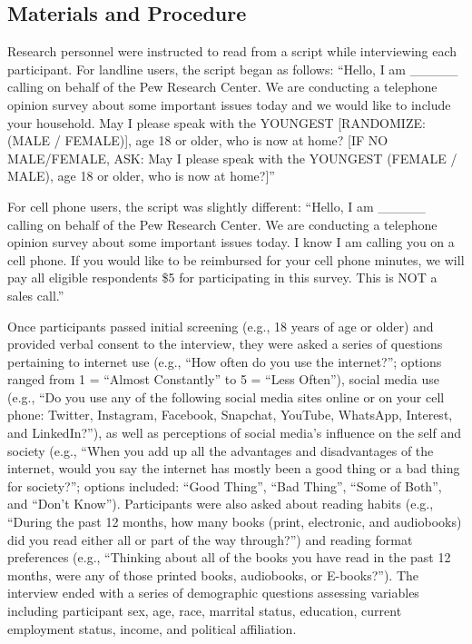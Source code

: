 \documentclass[man, fleqn, noextraspace]{apa6}
\theoremstyle{definition}
\theoremstyle{definition}
\theoremstyle{definition}
\theoremstyle{remark}
\begin{document}
\subsection{Materials and Procedure}\label{materials-and-procedure}

Research personnel were instructed to read from a script while
interviewing each participant. For landline users, the script began as
follows: \enquote{Hello, I am \_\_\_\_\_ calling on behalf of the Pew
Research Center. We are conducting a telephone opinion survey about some
important issues today and we would like to include your household. May
I please speak with the YOUNGEST {[}RANDOMIZE: (MALE / FEMALE){]}, age
18 or older, who is now at home? {[}IF NO MALE/FEMALE, ASK: May I please
speak with the YOUNGEST (FEMALE / MALE), age 18 or older, who is now at
home?{]}}

For cell phone users, the script was slightly different: \enquote{Hello,
I am \_\_\_\_\_ calling on behalf of the Pew Research Center. We are
conducting a telephone opinion survey about some important issues today.
I know I am calling you on a cell phone. If you would like to be
reimbursed for your cell phone minutes, we will pay all eligible
respondents \$5 for participating in this survey. This is NOT a sales
call.}

Once participants passed initial screening (e.g., 18 years of age or
older) and provided verbal consent to the interview, they were asked a
series of questions pertaining to internet use (e.g., \enquote{How often
do you use the internet?}; options ranged from 1 = \enquote{Almost
Constantly} to 5 = \enquote{Less Often}), social media use (e.g.,
\enquote{Do you use any of the following social media sites online or on
your cell phone: Twitter, Instagram, Facebook, Snapchat, YouTube,
WhatsApp, Interest, and LinkedIn?}), as well as perceptions of social
media's influence on the self and society (e.g., \enquote{When you add
up all the advantages and disadvantages of the internet, would you say
the internet has mostly been a good thing or a bad thing for society?};
options included: \enquote{Good Thing}, \enquote{Bad Thing},
\enquote{Some of Both}, and \enquote{Don't Know}). Participants were
also asked about reading habits (e.g., \enquote{During the past 12
months, how many books (print, electronic, and audiobooks) did you read
either all or part of the way through?}) and reading format preferences
(e.g., \enquote{Thinking about all of the books you have read in the
past 12 months, were any of those printed books, audiobooks, or
E-books?}). The interview ended with a series of demographic questions
assessing variables including participant sex, age, race, marrital
status, education, current employment status, income, and political
affiliation.
\end{document}
